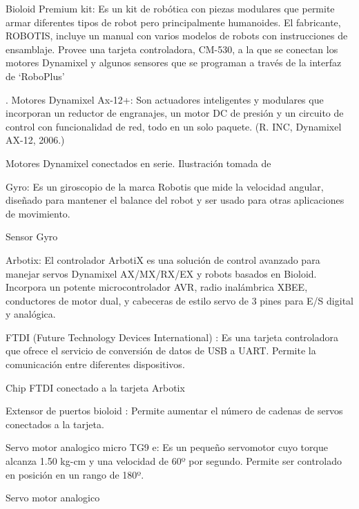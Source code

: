 Bioloid Premium kit: Es un kit de robótica con piezas modulares que permite armar diferentes tipos de robot pero principalmente humanoides. El fabricante, ROBOTIS, incluye un manual con varios modelos de robots con instrucciones de ensamblaje. Provee una tarjeta controladora, CM-530, a la que se conectan los motores Dynamixel y algunos sensores que se programan a través de la interfaz de ‘RoboPlus’

.    
Motores Dynamixel Ax-12+: Son actuadores inteligentes y modulares que incorporan un reductor de engranajes, un motor DC de presión y un circuito de control con funcionalidad de red, todo en un solo paquete. (R. INC, Dynamixel AX-12, 2006.)

Motores Dynamixel conectados en serie.
Ilustración  tomada de %

Gyro: Es un giroscopio de la marca Robotis que mide la velocidad angular, diseñado para mantener el balance del robot y ser usado para otras aplicaciones de movimiento. 

Sensor Gyro 

Arbotix: El controlador ArbotiX es una solución de control avanzado para manejar servos Dynamixel AX/MX/RX/EX y robots basados en Bioloid. Incorpora un potente microcontrolador AVR, radio inalámbrica XBEE, conductores de motor dual, y cabeceras de estilo servo de 3 pines para E/S digital y analógica.

FTDI (Future Technology Devices International) : Es una tarjeta controladora que ofrece el servicio de conversión de datos de USB a UART. Permite la comunicación entre diferentes dispositivos. 


Chip FTDI conectado a la tarjeta Arbotix

Extensor de puertos bioloid : Permite aumentar el número de cadenas de servos conectados a la tarjeta. 



Servo motor analogico micro TG9 e: Es un pequeño servomotor cuyo torque alcanza 1.50 kg-cm y una velocidad de 60º por segundo. Permite ser controlado en posición en un rango de 180º. 

Servo motor analogico 


